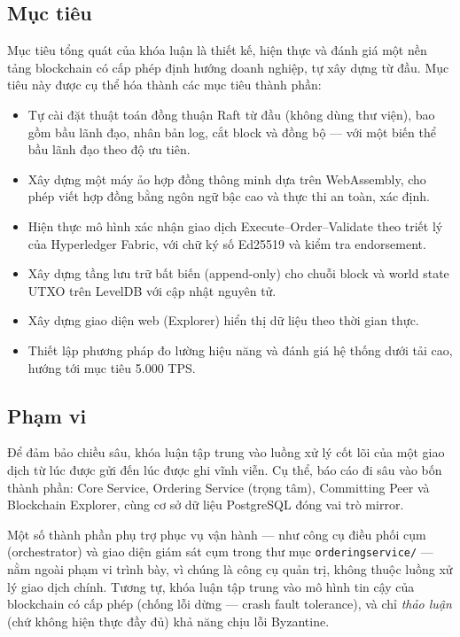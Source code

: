 \subsection{Mục tiêu}

Mục tiêu tổng quát của khóa luận là thiết kế, hiện thực và đánh giá một
nền tảng blockchain có cấp phép định hướng doanh nghiệp, tự xây dựng từ đầu.
Mục tiêu này được cụ thể hóa thành các mục tiêu thành phần:

\begin{itemize}
  \item Tự cài đặt thuật toán đồng thuận Raft từ đầu (không dùng thư
  viện), bao gồm bầu lãnh đạo, nhân bản log, cắt block và đồng bộ --- với một
  biến thể bầu lãnh đạo theo độ ưu tiên.

  \item Xây dựng một máy ảo hợp đồng thông minh dựa trên WebAssembly,
  cho phép viết hợp đồng bằng ngôn ngữ bậc cao và thực thi an toàn, xác định.

  \item Hiện thực mô hình xác nhận giao dịch Execute--Order--Validate
  theo triết lý của Hyperledger Fabric, với chữ ký số Ed25519 và kiểm tra
  endorsement.

  \item Xây dựng tầng lưu trữ bất biến (append-only) cho chuỗi block và world
  state UTXO trên LevelDB với cập nhật nguyên tử.

  \item Xây dựng giao diện web (Explorer) hiển thị dữ liệu theo thời gian thực.

  \item Thiết lập phương pháp đo lường hiệu năng và đánh giá hệ thống dưới tải
  cao, hướng tới mục tiêu 5.000 TPS.
\end{itemize}

\subsection{Phạm vi}

Để đảm bảo chiều sâu, khóa luận tập trung vào luồng xử lý cốt lõi của
một giao dịch từ lúc được gửi đến lúc được ghi vĩnh viễn. Cụ thể, báo cáo đi sâu
vào bốn thành phần: Core Service, Ordering Service (trọng tâm), Committing Peer
và Blockchain Explorer, cùng cơ sở dữ liệu PostgreSQL đóng vai trò mirror.

Một số thành phần phụ trợ phục vụ vận hành --- như công cụ điều phối cụm
(orchestrator) và giao diện giám sát cụm trong thư mục \texttt{orderingservice/}
--- nằm ngoài phạm vi trình bày, vì chúng là công cụ quản trị, không
thuộc luồng xử lý giao dịch chính. Tương tự, khóa luận tập trung vào mô hình tin
cậy của blockchain có cấp phép (chống lỗi dừng --- crash fault tolerance), và
chỉ \textit{thảo luận} (chứ không hiện thực đầy đủ) khả năng chịu lỗi Byzantine.

